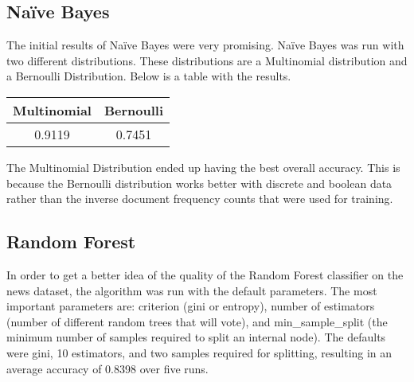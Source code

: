 \documentclass[fleqn,11pt]{article}
\begin{document}
\begin{multicols}{2}
        \subsection{Na\"ive Bayes}
        The initial results of Naïve Bayes were very promising. Naïve Bayes was run with two 
        different distributions. These distributions are a Multinomial distribution and a 
        Bernoulli Distribution. Below is a table with the results.
        \begin{center}
            \begin{tabular}{|cc|}
                \hline
                Multinomial & Bernoulli\\
                \hline
                0.9119      & 0.7451\\
                \hline
            \end{tabular}
        \end{center}
        The Multinomial Distribution ended up having the best overall accuracy. This is 
        because the Bernoulli distribution works better with discrete and boolean data rather 
        than the inverse document frequency counts that were used for training.
        \subsection{Random Forest}
        In order to get a better idea of the quality of the Random Forest classifier on the 
        news dataset, the algorithm was run with the default parameters. The most important 
        parameters are: criterion (gini or entropy), number of estimators (number of 
        different random trees that will vote), and min\_sample\_split (the minimum number of 
        samples required to split an internal node). The defaults were gini, 10 estimators, 
        and two samples required for splitting, resulting in an average accuracy of 0.8398 
        over five runs. 

\end{multicols}
\end{document}
